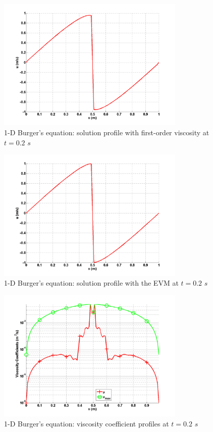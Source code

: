 \begin{figure}[H]
        \centering
        \includegraphics[width=0.8\textwidth]{figures/1D_sol_fo.png}
        \caption{1-D Burger's equation: solution profile with first-order viscosity at $t=0.2$ $s$}
        \label{fig:1d_burger_fo}
\end{figure}
%        
\begin{figure}[H]
        \centering
        \includegraphics[width=0.8\textwidth]{figures/1D_sol_ev.png}
        \caption{1-D Burger's equation: solution profile with the EVM at $t=0.2$ $s$}
        \label{fig:1d_burger_ev}
\end{figure}
%       
\begin{figure}[H]
    \centering
    \includegraphics[width=0.8\textwidth]{figures/1D_visc.png}
    \caption{1-D Burger's equation: viscosity coefficient profiles at $t=0.2$ $s$}
    \label{fig:1d_burger_visc}
\end{figure}
